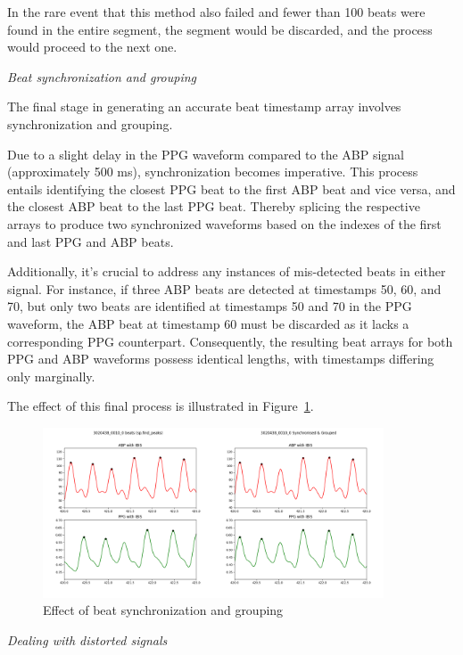In the rare event that this method also failed and fewer than 100 beats were found in the entire segment, the segment would be discarded, and the process would proceed to the next one.

\vspace{0.2cm}
\textit{Beat synchronization and grouping}
\vspace{0.2cm}

The final stage in generating an accurate beat timestamp array involves synchronization and grouping.

Due to a slight delay in the PPG waveform compared to the ABP signal (approximately 500 ms), synchronization becomes imperative.
This process entails identifying the closest PPG beat to the first ABP beat and vice versa, and the closest ABP beat to the last PPG beat.
Thereby splicing the respective arrays to produce two synchronized waveforms based on the indexes of the first and last PPG and ABP beats.

Additionally, it's crucial to address any instances of mis-detected beats in either signal.
For instance, if three ABP beats are detected at timestamps 50, 60, and 70, but only two beats are identified at timestamps 50 and 70 in the PPG waveform,
the ABP beat at timestamp 60 must be discarded as it lacks a corresponding PPG counterpart.
Consequently, the resulting beat arrays for both PPG and ABP waveforms possess identical lengths, with timestamps differing only marginally.

The effect of this final process is illustrated in Figure~\ref{fig:synchronized}.

\begin{figure}[h]
    \includegraphics[width=0.9\textwidth]{images/methods/synchronised}
    \caption{Effect of beat synchronization and grouping}
    \label{fig:synchronized}
\end{figure}

\vspace{0.2cm}
\textit{Dealing with distorted signals}
\vspace{0.2cm}

